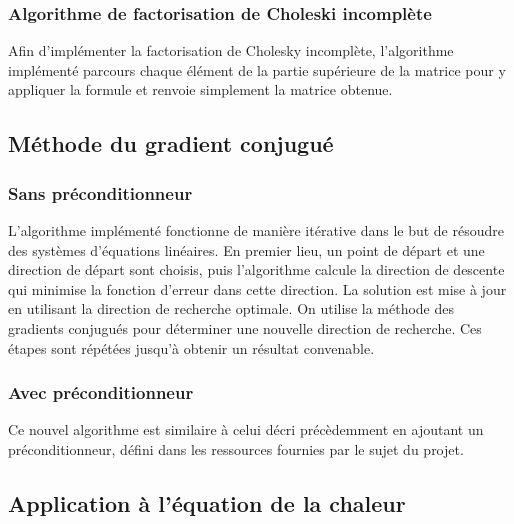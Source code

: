 \subsubsection{Algorithme de factorisation de Choleski incomplète}

Afin d'implémenter la factorisation de Cholesky incomplète, l'algorithme implémenté parcours chaque élément de la partie supérieure de la matrice pour y appliquer la formule et renvoie simplement la matrice obtenue.

\subsection{Méthode du gradient conjugué}

\subsubsection{Sans préconditionneur}

L'algorithme implémenté fonctionne de manière itérative dans le but de résoudre des systèmes d'équations linéaires. En premier lieu, un point de départ et une direction de départ sont choisis, puis l'algorithme calcule la direction de descente qui minimise la fonction d'erreur dans cette direction. La solution est mise à jour en utilisant la direction de recherche optimale. On utilise la méthode des gradients conjugués pour déterminer une nouvelle direction de recherche. Ces étapes sont répétées jusqu'à obtenir un résultat convenable.

\subsubsection{Avec préconditionneur}

Ce nouvel algorithme est similaire à celui décri précèdemment en ajoutant un préconditionneur, défini dans les ressources fournies par le sujet du projet.

\subsection{Application à l'équation de la chaleur}

